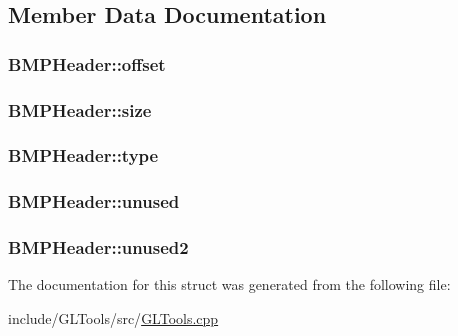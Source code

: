 \subsection{Member Data Documentation}
\hypertarget{struct_b_m_p_header_a6adff8db296330066687d87a0d8ef588}{
\subsubsection[{offset}]{ B\-M\-P\-Header\-::offset}}\label{struct_b_m_p_header_a6adff8db296330066687d87a0d8ef588}
\hypertarget{struct_b_m_p_header_a2222008e2596776c3084a73633f126ce}{
\subsubsection[{size}]{ B\-M\-P\-Header\-::size}}\label{struct_b_m_p_header_a2222008e2596776c3084a73633f126ce}
\hypertarget{struct_b_m_p_header_a4e9305ba624f3049c44583b5e0e800ff}{
\subsubsection[{type}]{ B\-M\-P\-Header\-::type}}\label{struct_b_m_p_header_a4e9305ba624f3049c44583b5e0e800ff}
\hypertarget{struct_b_m_p_header_afabe8ec4388e32908df68bc2d16be08f}{
\subsubsection[{unused}]{ B\-M\-P\-Header\-::unused}}\label{struct_b_m_p_header_afabe8ec4388e32908df68bc2d16be08f}
\hypertarget{struct_b_m_p_header_af9f40b8b630a86ab783f1ae423919626}{
\subsubsection[{unused2}]{ B\-M\-P\-Header\-::unused2}}\label{struct_b_m_p_header_af9f40b8b630a86ab783f1ae423919626}


The documentation for this struct was generated from the following file\-:\begin{DoxyCompactItemize}
\item 
include/\-G\-L\-Tools/src/\hyperlink{_g_l_tools_8cpp}{G\-L\-Tools.\-cpp}\end{DoxyCompactItemize}
